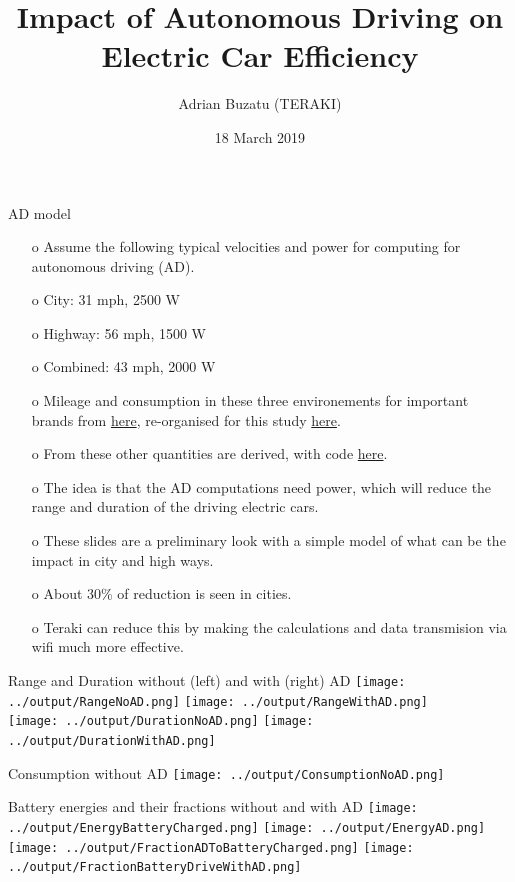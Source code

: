 \documentclass{beamer}
\title[AD impact on electric car efficiency]{Impact of Autonomous Driving on Electric Car Efficiency}
\author[Adrian Buzatu (TERAKI) ]{Adrian Buzatu (TERAKI)}
\date{18 March 2019}
\begin{document}

\frame{\titlepage} 
\def \AdrianSize {0.45}
\def \AdrianSizeOne {0.95}



\begin{frame}{AD model}
\begin{enumerate}
\item[o] Assume the following typical velocities and power for computing for autonomous driving (AD).
\item[o] City: 31 mph, 2500 W
\item[o] Highway: 56 mph, 1500 W
\item[o] Combined: 43 mph, 2000 W
\item[o] Mileage and consumption in these three environements for important brands from \href{https://pushevs.com/electric-car-range-efficiency-epa/}{here}, re-organised for this study \href{https://gitlab.cern.ch/abuzatu/BuzatuPython/blob/master/examples/teraki/electricCarEfficiency/input/data.txt}{here}.
\item[o] From these other quantities are derived, with code \href{https://gitlab.cern.ch/abuzatu/BuzatuPython/blob/master/examples/teraki/electricCarEfficiency/electricCarEfficiency.py}{here}.
\item[o] The idea is that the AD computations need power, which will reduce the range and duration of the driving electric cars.
\item[o] These slides are a preliminary look with a simple model of what can be the impact in city and high ways.
\item[o] About 30\% of reduction is seen in cities. 
\item[o] Teraki can reduce this by making the calculations and data transmision via wifi much more effective.
\end{enumerate}
\end{frame}

\begin{frame}{Range and Duration without (left) and with (right) AD}
\centering
\texttt{[image: ../output/RangeNoAD.png]}
\texttt{[image: ../output/RangeWithAD.png]}\\
\texttt{[image: ../output/DurationNoAD.png]}
\texttt{[image: ../output/DurationWithAD.png]}\\
\end{frame}

\begin{frame}{Consumption without AD}
\centering
\texttt{[image: ../output/ConsumptionNoAD.png]}
\end{frame}

\begin{frame}{Battery energies and their fractions without and with AD}
\centering
\texttt{[image: ../output/EnergyBatteryCharged.png]}
\texttt{[image: ../output/EnergyAD.png]}\\
\texttt{[image: ../output/FractionADToBatteryCharged.png]}
\texttt{[image: ../output/FractionBatteryDriveWithAD.png]}\\
\end{frame}
\end{document}
